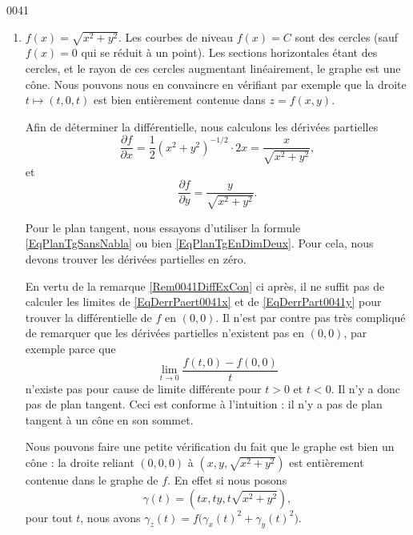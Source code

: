 
\begin{corrige}{0041}

\begin{enumerate}

\item 
$f(x)=\sqrt{x^2+y^2}$. Les courbes de niveau $f(x)=C$ sont des cercles (sauf $f(x)=0$ qui se réduit à un point). Les sections horizontales étant des cercles, et le rayon de ces cercles augmentant linéairement, le graphe est une cône. Nous pouvons nous en convaincre en vérifiant par exemple que la droite $t\mapsto(t,0,t)$ est bien entièrement contenue dans $z=f(x,y)$. 

Afin de déterminer la différentielle, nous calculons les dérivées partielles
\begin{equation}		\label{EqDerrPaert0041x}
	\frac{ \partial f }{ \partial x }=\frac{1}{ 2 }(x^2+y^2)^{-1/2}\cdot 2x=\frac{ x }{ \sqrt{x^2+y^2} },
\end{equation}
et
\begin{equation}		\label{EqDerrPart0041y}
	\frac{ \partial f }{ \partial y }=\frac{ y }{ \sqrt{x^2+y^2} }.
\end{equation}

Pour le plan tangent, nous essayons d'utiliser la formule \eqref{EqPlanTgSansNabla} ou bien \eqref{EqPlanTgEnDimDeux}. Pour cela, nous devons trouver les dérivées partielles en zéro. 

En vertu de la remarque \ref{Rem0041DiffExCon} ci après, il ne suffit pas de calculer les limites de \ref{EqDerrPaert0041x} et de \ref{EqDerrPart0041y} pour trouver la différentielle de $f$ en $(0,0)$. Il n'est par contre pas très compliqué de remarquer que les dérivées partielles n'existent pas en $(0,0)$, par exemple parce que
\begin{equation}
	\lim_{t\to 0}\frac{ f(t,0)-f(0,0) }{ t }
\end{equation}
n'existe pas pour cause de limite différente pour $t>0$ et $t<0$. Il n'y a donc pas de plan tangent.  Ceci est conforme à l'intuition : il n'y a pas de plan tangent à un cône en son sommet.

Nous pouvons faire une petite vérification du fait que le graphe est bien un cône : la droite reliant $(0,0,0)$ à $(x,y,\sqrt{x^2+y^2})$ est entièrement contenue dans le graphe de $f$. En effet si nous posons
\begin{equation}
	\gamma(t)=(tx,ty,t\sqrt{x^2+y^2}),
\end{equation}
pour tout $t$, nous avons $\gamma_z(t)=f\big( \gamma_x(t)^2+\gamma_y(t)^2 \big)$.


\end{enumerate}
\end{corrige}
